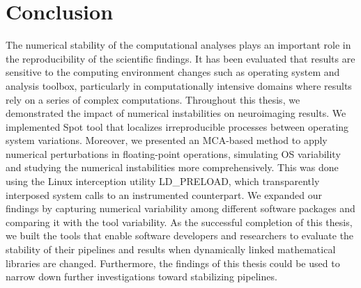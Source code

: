 \chapter{Conclusion}
\label{ch:conclusion}

The numerical stability of the computational analyses plays an important role in the reproducibility
of the scientific findings. It has been evaluated that results are sensitive to the
computing environment changes such as operating system and analysis toolbox, particularly
in computationally intensive domains where results rely on a series of complex computations.
Throughout this thesis, we demonstrated the impact of numerical instabilities on neuroimaging results. 
We implemented Spot tool that localizes irreproducible processes between operating system variations.
Moreover, we presented an MCA-based method to apply numerical perturbations in floating-point operations,
simulating OS variability and studying the numerical instabilities more comprehensively.
This was done using the Linux interception utility LD\_PRELOAD,
which transparently interposed system calls to an instrumented counterpart.
We expanded our findings by capturing numerical variability among different software packages and comparing it with the tool variability.
As the successful completion of this thesis, we built the tools that enable software developers
and researchers to evaluate the stability of their pipelines and results when dynamically
linked mathematical libraries are changed. Furthermore, the findings of this thesis could be
used to narrow down further investigations toward stabilizing pipelines.
